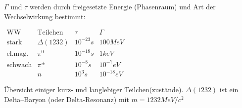\documentclass[Ex4_Zusammenfassung.tex]{subfiles}
\begin{document}
$\Gamma$ und $\tau$ werden durch freigesetzte Energie (Phasenraum) und Art der Wechselwirkung bestimmt:
\begin{table}[H]
	\centering
	$
	\begin{array}{clrr}
		\text{WW} 	& \text{Teilchen} & \tau & \Gamma \\ \hline
		\text{stark} & \Delta (1232)     & 10^{-23} \si{s}& 100 \si{MeV}\\
		\text{el.mag.} & \pi^0 & 10^{-18} \si{s} & 1\si{keV}\\
		\text{schwach} & \pi^\pm & 10^{-8} \si{s} & 10^{-7}\si{eV}\\
		& n & 10^3 \si{s} & 10^{-18} \si{eV}
	\end{array} 
	$
	\caption{Übersicht einiger kurz- und langlebiger Teilchen(zustände). $\Delta(1232)$ ist ein Delta--Baryon (oder Delta-Resonanz) mit $m=1232 \si{MeV/c^2}$}
\end{table}
\end{document}
